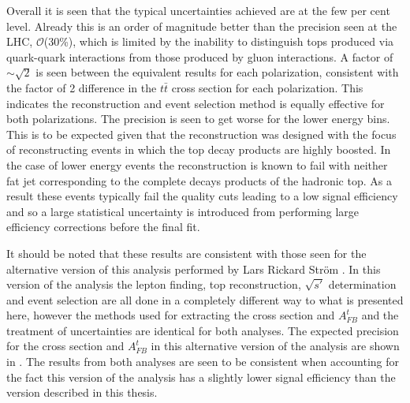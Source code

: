 Overall it is seen that the typical uncertainties achieved are at the few per cent level. Already this is an order of magnitude better than the precision seen at the \ac{LHC}, $\mathcal{O}$(30\%)\cite{Bai:2011uk}, which is limited by the inability to distinguish tops produced via quark-quark interactions from those produced by gluon interactions. A factor of $\sim\sqrt{2}$ is seen between the equivalent results for each polarization, consistent with the factor of 2 difference in the $t\bar{t}$ cross section for each polarization. This indicates the reconstruction and event selection method is equally effective for both polarizations. The precision is seen to get worse for the lower energy bins. This is to be expected given that the reconstruction was designed with the focus of reconstructing events in which the top decay products are highly boosted. In the case of lower energy events the reconstruction is known to fail with neither fat jet corresponding to the complete decays products of the hadronic top. As a result these events typically fail the quality cuts leading to a low signal efficiency and so a large statistical uncertainty is introduced from  performing large efficiency corrections before the final fit.

It should be noted that these results are consistent with those seen for the alternative version of this analysis performed by Lars Rickard Str{\"o}m \cite{TopPaperDraft}. In this version of the analysis the lepton finding, top reconstruction, $\sqrt{s'}$ determination and event selection are all done in a completely different way to what is presented here, however the methods used for extracting the cross section and $A_{FB}^t$ and the treatment of uncertainties are identical for both analyses. The expected precision for the cross section and $A_{FB}^t$ in this alternative version of the analysis are shown in . The results from both analyses are seen to be consistent when accounting for the fact this version of the analysis has a slightly lower signal efficiency than the version described in this thesis.

